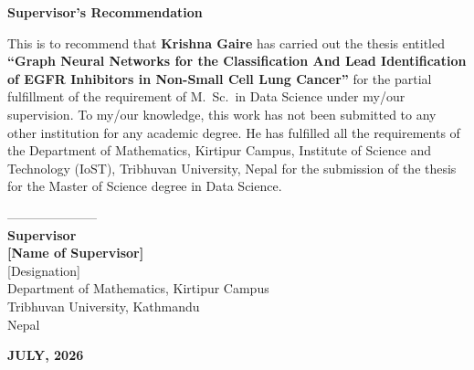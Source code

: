 
\cleardoublepage
{}
{}
\thispagestyle{plain}

\begin{center}
{\fontsize{16}{20}\selectfont\textbf{Supervisor's Recommendation}}
\end{center}

\vspace{0.5cm}

\begin{onehalfspace}
\noindent
This is to recommend that \textbf{Krishna Gaire} has carried out
the thesis entitled \textbf{``Graph Neural Networks for the
Classification And Lead Identification of EGFR Inhibitors in
Non-Small Cell Lung Cancer''} for the partial fulfillment of the
requirement of M.\ Sc.\ in Data Science under my/our supervision.
To my/our knowledge, this work has not been submitted to any other
institution for any academic degree. He has fulfilled all the
requirements of the Department of Mathematics, Kirtipur Campus,
Institute of Science and Technology (IoST), Tribhuvan University,
Nepal for the submission of the thesis for the Master of Science
degree in Data Science.
\end{onehalfspace}

\vspace{2.5cm}

\begin{onehalfspace}
\noindent
---------------------\\[0.2cm]
\textbf{Supervisor}\\[0.2cm]
\textbf{{[Name of Supervisor]}}\\
{[Designation]}\\
Department of Mathematics, Kirtipur Campus\\
Tribhuvan University, Kathmandu\\
Nepal

\vfill

\begin{center}
\textbf{JULY, 2026}
\end{center}
\vspace{0.5cm}
\end{onehalfspace}